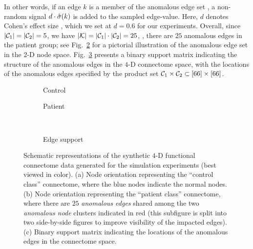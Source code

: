 In other words, if an edge $k$ is a member of the anomalous edge set \calK, a non-random signal $d\cdot\hat{\sigma}(k)$ is added to the sampled edge-value.
Here, $d$ denotes Cohen's effect size \citep{Cohen:1988}, which we set at $d=0.6$ for our experiments.
Overall, since $\left| \mathcal{C}_1 \right|=\left| \mathcal{C}_2 \right|=5$, we have $\left| \mathcal{K} \right|=\left| \mathcal{C}_1 \right|\cdot\left| \mathcal{C}_2 \right|=25$, \ie, there are $25$ anomalous edges in the patient group; see Fig.~\ref{subfig:sim,conn,struct,ds} for a pictorial illustration of the anomalous edge set \calK in the $2$-D node space.
Fig.~\ref{subfig:sim,conn,struct,supp} presents a binary support matrix indicating the structure of the anomalous edges in the $4$-D connectome space, with the locations of the anomalous edges specified by the product set $\mathcal{C}_1\times \mathcal{C}_2\subset[66]\times[66]$. 

\begin{figure}
	\centering
	\begin{subfigure}[b]{0.25\linewidth}
		 \centering
		 \resizebox{0.94\linewidth}{!}{}
		 \caption{Control}
		 \label{subfig:sim,conn,struct,hc}
	\end{subfigure}
	\hspace{-4pt}
	\begin{subfigure}[b]{0.5\linewidth}
		 \centering
		 \resizebox{0.94\linewidth}{!}{}
		 \caption{Patient}
		 \label{subfig:sim,conn,struct,ds}
	\end{subfigure}
	\begin{subfigure}[b]{0.235\linewidth}
		 \centering
		 \vspace{-5pt}\\
		 \caption{Edge support}
		 \label{subfig:sim,conn,struct,supp}
	\end{subfigure}
	\vspace{-12pt}
	\caption{
		Schematic representations of the synthetic $4$-D functional connectome data generated for the simulation experiments (best viewed in color). 
		(a) Node orientation representing the ``control class'' connectome, where the blue nodes indicate
the normal nodes.
		(b) Node orientation representing the ``patient class'' connectome, where there are $25$ \emph{anomalous edges} shared among the two \emph{anomalous node} clusters indicated in red (this subfigure is split into two side-by-side figures to improve visibility of the impacted edges).
		(c) Binary support matrix indicating the locations of the anomalous edges in the connectome space.
	}
	\label{fig:sim,conn,struct}
\end{figure}

